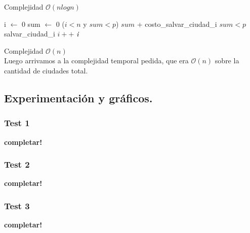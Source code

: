 Complejidad $\mathcal{O}(n log n)$

\begin{codebox}
\li i $\leftarrow$ 0
\li sum $\leftarrow$ 0
\li \While ($i<n$ y $sum<p$)    
\li 	\quad	$sum$ + costo_salvar_ciudad_i   
\li	\quad	\If $sum<p$
\li	\quad\quad	salvar_ciudad_i
\li	\quad	$i++$
\li \Return $\id{i}$       
\end{codebox} 

Complejidad $\mathcal{O}(n)$
\\
Luego arrivamos a la complejidad temporal pedida, que era $\mathcal{O}(n)$ sobre la cantidad de ciudades total.


\newpage
\subsection{Experimentación y gráficos.}

\vspace*{0.3cm}

\subsubsection{Test 1}

\vspace*{0.3cm}

\textbf{completar!}


\newpage
\subsubsection{Test 2}

\vspace*{0.3cm}

\textbf{completar!}


\newpage
\subsubsection{Test 3}

\vspace*{0.3cm}

\textbf{completar!}
